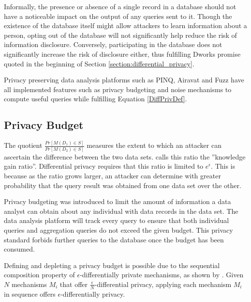 Informally, the presence or absence of a single record in a database should not have a noticeable impact on the output of any queries sent to it. Though the existence of the database itself might allow attackers to learn information about a person, opting out of the database will not significantly help reduce the risk of information disclosure. Conversely, participating in the database does not significantly increase the risk of disclosure either, thus fulfilling Dworks promise quoted in the beginning of Section \ref{section:differential_privacy}.

Privacy preserving data analysis platforms such as PINQ\citep{mcsherry2009PINQ}, Airavat\citep{roy2010airavat} and Fuzz\citep{Haeberlen2011fuzz} have all implemented features such as privacy budgeting and noise mechanisms to compute useful queries while fulfilling Equation \ref{DiffPrivDef}.

\subsection{Privacy Budget}
\label{section:privacy_budget}
The quotient $\frac{Pr[M(D_1)\in S]}{Pr[M(D_2)\in S]}$ measures the extent to which an attacker can ascertain the difference between the two data sets\citep{abowd2008protective}. \cite{Sarathy2011evaluating} calls this ratio the ''knowledge gain ratio''. Differential privacy requires that this ratio is limited to $e^\epsilon$. This is because as the ratio grows larger, an attacker can determine with greater probability that the query result was obtained from one data set over the other.

Privacy budgeting was introduced to limit the amount of information a data analyst can obtain about any individual with data records in the data set. The data analysis platform will track every query to ensure that both individual queries and aggregation queries do not exceed the given budget. This privacy standard forbids further queries to the database once the budget has been consumed. 

Defining and depleting a privacy budget is possible due to the sequential composition property of $\epsilon$-differentially private mechanisms, as shown by \cite{mcsherry2009PINQ}. Given $N$ mechanisms $M_i$ that offer $\frac{\epsilon}{N}$-differential privacy, applying each mechanism $M_i$ in sequence offers $\epsilon$-differentially privacy.



